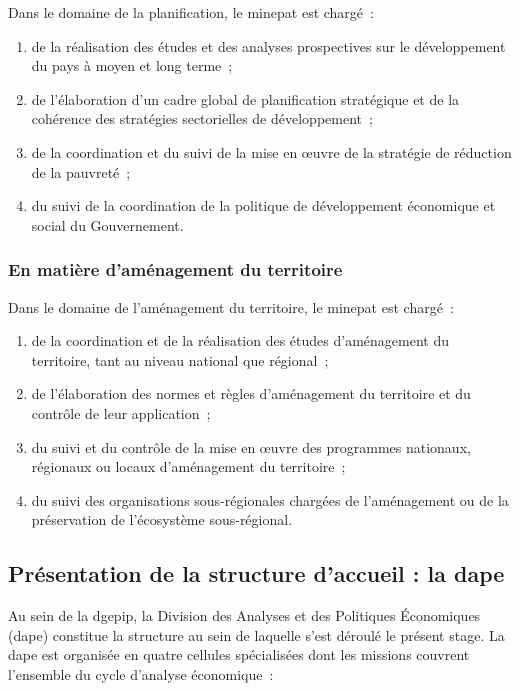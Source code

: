 \documentclass[12pt, a4paper, oneside]{report}
\begin{document}
Dans le domaine de la planification, le \gls{minepat} est chargé~:
\begin{enumerate}
	\item de la réalisation des études et des analyses prospectives sur le développement
	du pays à moyen et long terme~;
	\item de l'élaboration d'un cadre global de planification stratégique et de la
	cohérence des stratégies sectorielles de développement~;
	\item de la coordination et du suivi de la mise en \oe uvre de la stratégie de
	réduction de la pauvreté~;
	\item du suivi de la coordination de la politique de développement économique et
	social du Gouvernement.
\end{enumerate}

\subsubsection{En matière d'aménagement du territoire}

Dans le domaine de l'aménagement du territoire, le \gls{minepat} est chargé~:
\begin{enumerate}
	\item de la coordination et de la réalisation des études d'aménagement du territoire,
	tant au niveau national que régional~;
	\item de l'élaboration des normes et règles d'aménagement du territoire et du
	contrôle de leur application~;
	\item du suivi et du contrôle de la mise en \oe uvre des programmes nationaux,
	régionaux ou locaux d'aménagement du territoire~;
	\item du suivi des organisations sous-régionales chargées de l'aménagement ou de
	la préservation de l'écosystème sous-régional.
\end{enumerate}

\subsection{Présentation de la structure d'accueil : la \gls{dape}}

Au sein de la \gls{dgepip}, la Division des Analyses et des Politiques Économiques (\gls{dape})
constitue la structure au sein de laquelle s'est déroulé le présent stage. La \gls{dape} est
organisée en quatre cellules spécialisées dont les missions couvrent l'ensemble du
cycle d'analyse économique~:
\end{document}
